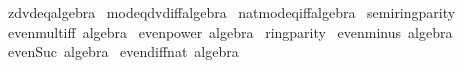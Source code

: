 \begin{isabellebody}
\isamarkupfalse%
\ zdvd{}{\isacharunderscore}{\kern0pt}eq{\isacharbrackleft}{\kern0pt}algebra{\isacharbrackright}{\kern0pt}\isanewline
{}\isamarkupfalse%
\ mod{\isacharunderscore}{\kern0pt}eq{\isacharunderscore}{\kern0pt}dvd{\isacharunderscore}{\kern0pt}iff{\isacharbrackleft}{\kern0pt}algebra{\isacharbrackright}{\kern0pt}\isanewline
{}\isamarkupfalse%
\ nat{\isacharunderscore}{\kern0pt}mod{\isacharunderscore}{\kern0pt}eq{\isacharunderscore}{\kern0pt}iff{\isacharbrackleft}{\kern0pt}algebra{\isacharbrackright}{\kern0pt}\isanewline
\isanewline
{}\isamarkupfalse%
\ semiring{\isacharunderscore}{\kern0pt}parity\isanewline
{}\isanewline
\isanewline
{}\isamarkupfalse%
\ even{\isacharunderscore}{\kern0pt}mult{\isacharunderscore}{\kern0pt}iff\ {\isacharbrackleft}{\kern0pt}algebra{\isacharbrackright}{\kern0pt}\isanewline
{}\isamarkupfalse%
\ even{\isacharunderscore}{\kern0pt}power\ {\isacharbrackleft}{\kern0pt}algebra{\isacharbrackright}{\kern0pt}\isanewline
\isanewline
{}\isamarkupfalse%
\isanewline
\isanewline
{}\isamarkupfalse%
\ ring{\isacharunderscore}{\kern0pt}parity\isanewline
{}\isanewline
\isanewline
{}\isamarkupfalse%
\ even{\isacharunderscore}{\kern0pt}minus\ {\isacharbrackleft}{\kern0pt}algebra{\isacharbrackright}{\kern0pt}\isanewline
\isanewline
{}\isamarkupfalse%
\isanewline
\isanewline
{}\isamarkupfalse%
\ even{\isacharunderscore}{\kern0pt}Suc\ {\isacharbrackleft}{\kern0pt}algebra{\isacharbrackright}{\kern0pt}\isanewline
{}\isamarkupfalse%
\ even{\isacharunderscore}{\kern0pt}diff{\isacharunderscore}{\kern0pt}nat\ {\isacharbrackleft}{\kern0pt}algebra{\isacharbrackright}{\kern0pt}\isanewline
%
\isadelimtheory
\isanewline
%
\endisadelimtheory
%
\isatagtheory
{}\isamarkupfalse%
%
\endisatagtheory
{\isafoldtheory}%
%
\isadelimtheory
%
\endisadelimtheory
%
\end{isabellebody}%
\endinput
